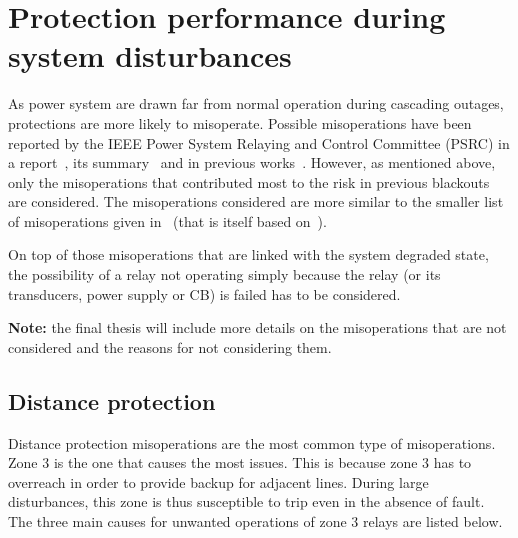 \section{Protection performance during system disturbances}
\label{sec:protectionPerformance}

As power system are drawn far from normal operation during cascading outages, protections are more likely to misoperate. Possible misoperations have been reported by the IEEE Power System Relaying and Control Committee (PSRC) in a report~\cite{PSRCreportProtectionMisop}, its summary~\cite{PSRCreportSummaryProtectionMisop} and in previous works~\cite{ProtectionFailuresDemetrios}. However, as mentioned above, only the misoperations that contributed most to the risk in previous blackouts are considered. The misoperations considered are more similar to the smaller list of misoperations given in~\cite[ch3]{ENTSOEdefencePlan} (that is itself based on~\cite{PSRCreportProtectionMisop, PSRCreportSummaryProtectionMisop, ProtectionFailuresDemetrios}).

On top of those misoperations that are linked with the system degraded state, the possibility of a relay not operating simply because the relay (or its transducers, power supply or CB) is failed has to be considered.


\textbf{Note:} the final thesis will include more details on the misoperations that are not considered and the reasons for not considering them.

\subsection{Distance protection}

Distance protection misoperations are the most common type of misoperations. Zone 3 is the one that causes the most issues. This is because zone 3 has to overreach in order to provide backup for adjacent lines. During large disturbances, this zone is thus susceptible to trip even in the absence of fault. The three main causes for unwanted operations of zone 3 relays are listed below.

